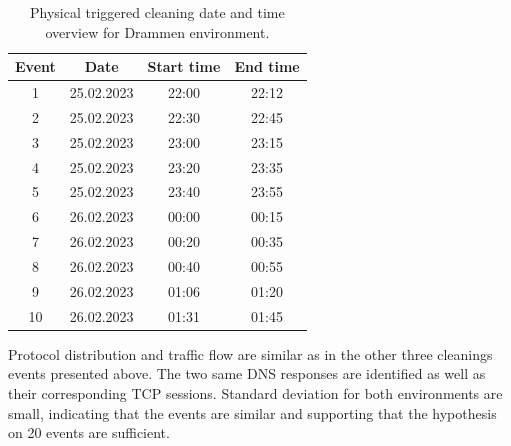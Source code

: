 \begin{table}[H]
\centering
\caption{Physical triggered cleaning date and time overview for Drammen environment.}
\label{tab:PTC_dateandtimeDrammen}
\begin{tabular}{|c|c|c|c|}
\hline
\textbf{Event} & \textbf{Date} & \textbf{Start time} & \textbf{End time} \\ \hline
1              & 25.02.2023         & 22:00               & 22:12             \\ \hline
2              & 25.02.2023         & 22:30               & 22:45             \\ \hline
3              & 25.02.2023         & 23:00               & 23:15             \\ \hline
4              & 25.02.2023         & 23:20               & 23:35             \\ \hline
5              & 25.02.2023         & 23:40               & 23:55             \\ \hline
6              & 26.02.2023         & 00:00               & 00:15             \\ \hline
7              & 26.02.2023         & 00:20               & 00:35             \\ \hline
8              & 26.02.2023         & 00:40               & 00:55             \\ \hline
9              & 26.02.2023         & 01:06               & 01:20             \\ \hline
10             & 26.02.2023         & 01:31               & 01:45             \\ \hline
\end{tabular}
\end{table}

Protocol distribution and traffic flow are similar as in the other three cleanings events presented above. The two same DNS responses are identified as well as their corresponding TCP sessions. Standard deviation for both environments are small, indicating that the events are similar and supporting that the hypothesis on 20 events are sufficient. 

